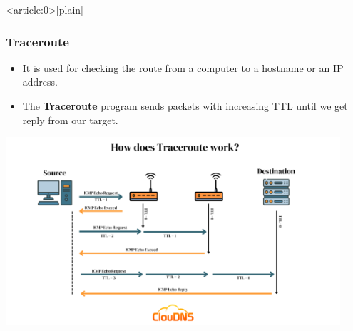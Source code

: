 \documentclass[aspectratio=169]{beamer}
\begin{document}
{ %
    \begin{frame}<article:0>[plain]
     \end{frame}
}


\begin{frame}
\frametitle{Traceroute}

\begin{itemize}
    \item It is used for checking the route from a computer to a hostname or an IP address.
    \item The \textbf{Traceroute} program sends packets with increasing TTL until we get reply from our target.
\end{itemize}

\centering\includegraphics[width=0.93\textwidth]{Trace.png}

\end{frame}
\end{document}
